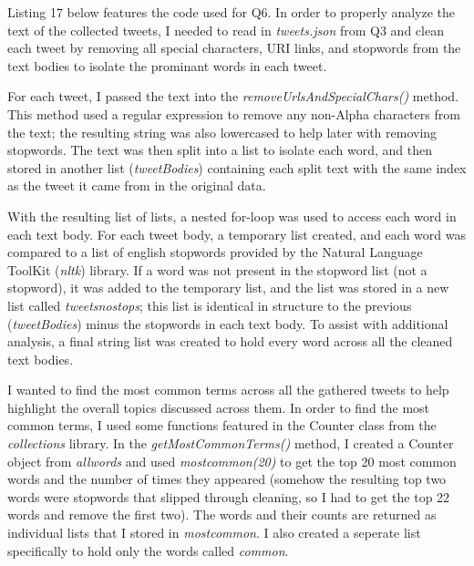 \documentclass[12pt]{article}
\begin{document}
Listing 17 below features the code used for Q6. In order to properly analyze the text of the collected tweets, I needed to read in \emph{tweets.json} from Q3 and clean each tweet by removing all special characters, URI links, and stopwords from the text bodies to isolate the prominant words in each tweet. 

\par For each tweet, I passed the text into the \emph{removeUrlsAndSpecialChars()} method. This method used a regular expression to remove any non-Alpha characters from the text; the resulting string was also lowercased to help later with removing stopwords. The text was then split into a list to isolate each word, and then stored in another list (\emph{tweet\textunderscore Bodies}) containing each split text with the same index as the tweet it came from in the original data.

\par With the resulting list of lists, a nested for-loop was used to access each word in each text body. For each tweet body, a temporary list created, and each word was compared to a list of english stopwords provided by the Natural Language ToolKit (\emph{nltk}) library. If a word was not present in the stopword list (not a stopword), it was added to the temporary list, and the list was stored in a new list called \emph{tweets\textunderscore no\textunderscore stops}; this list is identical in structure to the previous (\emph{tweet\textunderscore Bodies}) minus the stopwords in each text body. To assist with additional analysis, a final string list was created to hold every word across all the cleaned text bodies.

\par I wanted to find the most common terms across all the gathered tweets to help highlight the overall topics discussed across them. In order to find the most common terms, I used some functions featured in the Counter class from the \emph{collections} library. In the \emph{getMostCommonTerms()} method, I created a Counter object from \emph{all\textunderscore words} and used \emph{most\textunderscore common(20)} to get the top 20 most common words and the number of times they appeared (somehow the resulting top two words were stopwords that slipped through cleaning, so I had to get the top 22 words and remove the first two). The words and their counts are returned as individual lists that I stored in \emph{most\textunderscore common}. I also created a seperate list specifically to hold only the words called \emph{common}.
\end{document}
